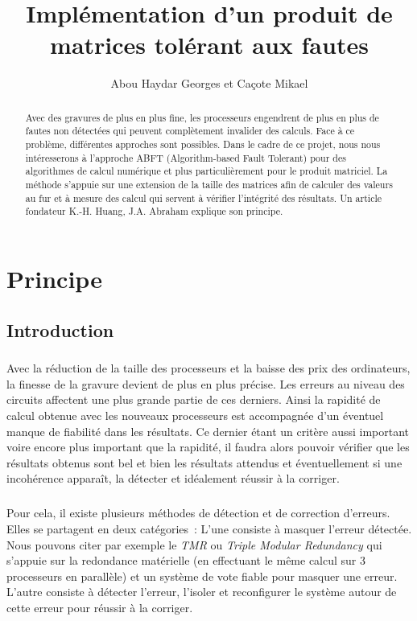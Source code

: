 \documentclass[a4paper,10pt]{report}
\title{Implémentation d'un produit de matrices tolérant
aux fautes}
\author{Abou Haydar Georges et Caçote Mikael}
\begin{document}
\maketitle
\renewcommand{\abstractname}{Introduction}
\renewcommand{\labelitemi}{$\bullet$}
\renewcommand{\labelitemii}{$\cdot$}
\begin{abstract}
Avec des gravures de plus en plus fine, les processeurs engendrent de plus en plus de fautes 
non détectées qui peuvent complètement invalider des calculs. Face à ce problème, différentes 
approches sont possibles. Dans le cadre de ce projet, nous nous intéresserons à l'approche ABFT 
(Algorithm-based Fault Tolerant) pour des algorithmes de calcul numérique et plus particulièrement 
pour le produit matriciel. La méthode s'appuie sur une extension de la taille des matrices afin de 
calculer des valeurs au fur et à mesure des calcul qui servent à vérifier l'intégrité des résultats. 
Un article fondateur K.-H. Huang, J.A. Abraham explique son principe. 
\end{abstract}

\chapter{Principe}
\section{Introduction}
\paragraph*{}
Avec la réduction de la taille des processeurs et la baisse des prix des ordinateurs, la finesse de 
la gravure devient de plus en plus précise. Les erreurs au niveau des circuits affectent une plus grande 
partie de ces derniers.\newline
Ainsi la rapidité de calcul obtenue avec les nouveaux processeurs est accompagnée d’un éventuel manque de 
fiabilité dans les résultats. Ce dernier étant un critère aussi important voire encore plus important que 
la rapidité, il faudra alors pouvoir vérifier que les résultats obtenus sont bel et bien les résultats 
attendus et éventuellement si une incohérence apparaît, la détecter et idéalement réussir à la corriger.
\paragraph*{}
Pour cela, il existe plusieurs méthodes de détection et de correction d’erreurs. Elles se partagent en 
deux catégories : L’une consiste à masquer l’erreur détectée. Nous pouvons citer par exemple le \textit{TMR} ou 
\textit{Triple Modular Redundancy} qui s’appuie sur la redondance matérielle (en effectuant le même calcul sur 
3 processeurs en parallèle) et un système de vote fiable pour masquer une erreur. L’autre consiste à 
détecter l’erreur, l’isoler et reconfigurer le système autour de cette erreur pour réussir à la corriger.
\end{document}
